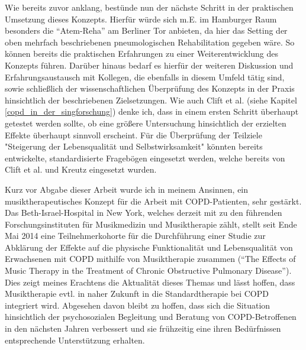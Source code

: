 
Wie bereits zuvor anklang, bestünde nun der nächste Schritt in der praktischen Umsetzung dieses Konzepts. Hierfür würde sich m.E. im Hamburger Raum besonders die "`Atem-Reha"' am Berliner Tor anbieten, da hier das Setting der oben mehrfach beschriebenen pneumologischen Rehabilitation gegeben wäre. So können bereits die praktischen Erfahrungen zu einer Weiterentwicklung des Konzepts führen. Darüber hinaus bedarf es hierfür der weiteren Diskussion und Erfahrungsaustausch mit Kollegen, die ebenfalls in diesem Umfeld tätig sind, sowie schließlich der wissenschaftlichen Überprüfung des Konzepts in der Praxis hinsichtlich der beschriebenen Zielsetzungen. Wie auch Clift et al. (siehe Kapitel \ref{copd_in_der_singforschung}) denke ich, dass in einem ersten Schritt überhaupt getestet werden sollte, ob eine größere Untersuchung hinsichtlich der erzielten Effekte überhaupt sinnvoll erscheint. Für die Überprüfung der Teilziele "Steigerung der Lebensqualität und Selbstwirksamkeit" könnten bereits entwickelte, standardisierte Fragebögen eingesetzt werden, welche bereits von Clift et al. und Kreutz eingesetzt wurden.

Kurz vor Abgabe dieser Arbeit wurde ich in meinem Ansinnen, ein musiktherapeutisches Konzept für die Arbeit mit COPD-Patienten, sehr gestärkt. Das Beth-Israel-Hospital in New York, welches derzeit mit zu den führenden Forschungsinstituten für Musikmedizin und Musiktherapie zählt, stellt seit Ende Mai 2014 eine Teilnehmerkohorte für die Durchführung einer Studie zur Abklärung der Effekte auf die physische Funktionalität und Lebensqualität von Erwachsenen mit COPD mithilfe von Musiktherapie zusammen ("`The Effects of Music Therapy in the Treatment of Chronic Obstructive Pulmonary Disease"'). Dies zeigt meines Erachtens die Aktualität dieses Themas und lässt hoffen, dass Musiktherapie evtl. in naher Zukunft in die Standardtherapie bei COPD integriert wird. Abgesehen davon bleibt zu hoffen, dass sich die Situation hinsichtlich der psychosozialen Begleitung und Beratung von COPD-Betroffenen in den nächsten Jahren verbessert und sie frühzeitig eine ihren Bedürfnissen entsprechende Unterstützung erhalten.


